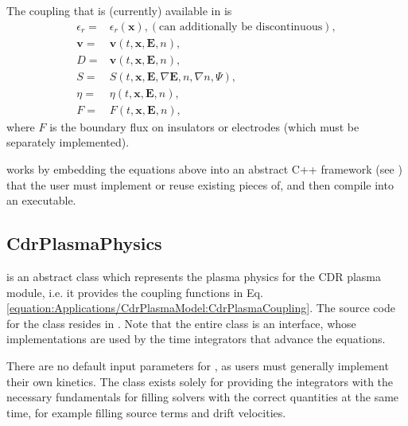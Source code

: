 \documentclass[letterpaper,10pt,english]{sphinxmanual}
\begin{document}
\sphinxAtStartPar
The coupling that is (currently) available in  is
\begin{equation}\label{equation:Applications/CdrPlasmaModel:CdrPlasmaCoupling}
\begin{split}\epsilon_r =& \epsilon_r(\mathbf{x}), (\textrm{can additionally be discontinuous}), \\
\mathbf{v} =& \mathbf{v}\left(t, \mathbf{x}, \mathbf{E}, n\right),\\
D =& \mathbf{v}\left(t, \mathbf{x}, \mathbf{E}, n\right),\\
S =& S\left(t, \mathbf{x}, \mathbf{E}, \nabla\mathbf{E}, n, \nabla n, \Psi\right),\\
\eta =& \eta\left(t, \mathbf{x}, \mathbf{E}, n\right),\\
F =& F(t, \mathbf{x}, \mathbf{E}, n),\end{split}
\end{equation}
\sphinxAtStartPar
where \(F\) is the boundary flux on insulators or electrodes (which must be separately implemented).

\sphinxAtStartPar
{} works by embedding the equations above into an abstract C++ framework (see {\hyperref[\detokenize{Applications/CdrPlasmaModel:chap-cdrplasmaphysics}]{}}) that the user must implement or reuse existing pieces of, and then compile into an executable.


\subsection{CdrPlasmaPhysics}
\label{\detokenize{Applications/CdrPlasmaModel:cdrplasmaphysics}}\label{\detokenize{Applications/CdrPlasmaModel:chap-cdrplasmaphysics}}
\sphinxAtStartPar
{\hyperref[\detokenize{Applications/CdrPlasmaModel:chap-cdrplasmaphysics}]{}} is an abstract class which represents the plasma physics for the CDR plasma module, i.e. it provides the coupling functions in Eq. \ref{equation:Applications/CdrPlasmaModel:CdrPlasmaCoupling}.
The source code for the class resides in .
Note that the entire class is an interface, whose implementations are used by the time integrators that advance the equations.

\sphinxAtStartPar
There are no default input parameters for {\hyperref[\detokenize{Applications/CdrPlasmaModel:chap-cdrplasmaphysics}]{}}, as users must generally implement their own kinetics.
The class exists solely for providing the integrators with the necessary fundamentals for filling solvers with the correct quantities at the same time, for example filling source terms and drift velocities.
\end{document}
